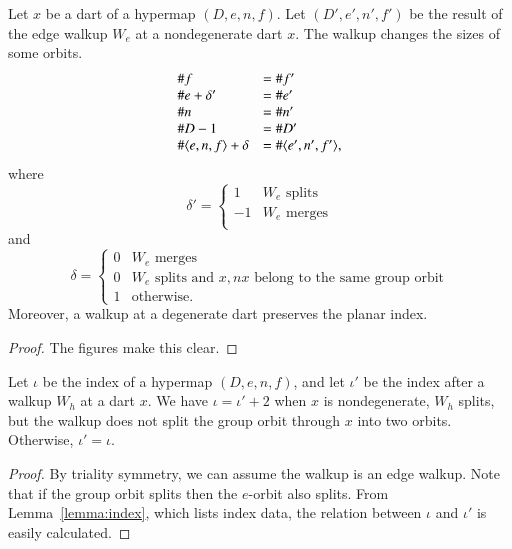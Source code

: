 \begin{lemma}\label{lemma:index} Let $x$ be a dart of a hypermap $(D,e,n,f)$. Let $(D',e',n',f')$ be the result of the edge walkup $W_e$ at
a nondegenerate dart $x$.  
The walkup changes the sizes of some orbits.
    $$
    \begin{array}{lll}
    \# f &= \# f'\\  
    \# e + \delta' &= \# e'\\
    \# n &= \# n'\\
    \# D - 1&= \# D' \\
    \# \langle e,n,f\rangle + \delta&= \#\langle e',n',f'\rangle,\\
    \end{array}
    $$
where
   $$
   \delta' = \begin{cases}
     1 & W_e \text{ splits }\\
    -1 & W_e \text{ merges}\\
   \end{cases}
   $$
and
   $$
   \delta = \begin{cases}
    0 & W_e \text{ merges }\\
    0 & W_e \text{ splits and } x,nx 
      \text{ belong to the same group orbit}\\
    1 & \text{otherwise}.
     \end{cases}
   $$
Moreover, a walkup at a degenerate dart preserves the planar index.
\end{lemma}

\begin{proof} The figures make this clear.
\end{proof}

\begin{lemma}  Let $\iota$ be the index of a  hypermap $(D,e,n,f)$, and
let $\iota'$ be the index after a walkup $W_h$
at a dart $x$.  We have $\iota = \iota' + 2$ when
$x$ is nondegenerate, $W_h$ splits, but the walkup does not
split the group orbit through $x$ into two orbits.
Otherwise, $\iota'=\iota$.
\end{lemma} 




\begin{proof}  By triality symmetry, 
we can assume the walkup is an edge walkup.  
Note that
if the group orbit splits then
the $e$-orbit also splits.
From Lemma~\ref{lemma:index},
which lists index data, the
relation between $\iota$ and $\iota'$ is easily calculated.
\end{proof}


